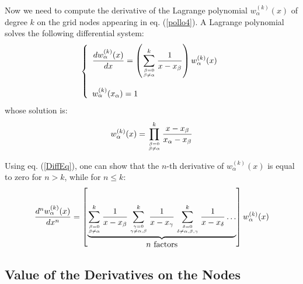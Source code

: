 \documentclass[10pt,a4paper]{article}
\begin{document}
Now we need to compute the derivative of the Lagrange polynomial
$w_\alpha^{(k)}(x)$ of degree $k$ on the grid nodes appearing in eq. (\ref{pollo4}). A
Lagrange polynomial solves the following differential system:
\begin{equation}\label{DiffEq}
\left\{
\begin{array}{l}
\displaystyle \frac{d w_\alpha^{(k)}(x)}{dx}
=\left(\sum_{\beta=0\atop \beta\neq\alpha}^k\frac{1}{x-x_\beta}\right)
w_\alpha^{(k)}(x)\\
\\
w_\alpha^{(k)}(x_\alpha) = 1
\end{array}
\right.
 \end{equation}
whose solution is:
\begin{equation}
w_\alpha^{(k)}(x) = \prod_{\beta=0\atop \beta\neq\alpha}^k\frac{x-x_\beta}{x_\alpha-x_\beta}
\end{equation}

Using eq. (\ref{DiffEq}), one can show that the $n$-th derivative of
$w_\alpha^{(k)}(x)$ is equal to zero for $n>k$, while for $n\leq k$:
\begin{equation}\label{NthDerivative}
\frac{d^n w_\alpha^{(k)}(x)}{dx^n}
=\left[\underbrace{\sum_{\beta=0\atop \beta\neq\alpha}^k\frac{1}{x-x_\beta}
\sum_{\gamma=0\atop \gamma\neq\alpha,\beta}^k\frac{1}{x-x_\gamma}
\sum_{\delta=0\atop \delta\neq\alpha,\beta,\gamma}^k\frac{1}{x-x_\delta}
\dots}_{\mbox{$n$ factors}}\right]
w_\alpha^{(k)}(x)
\end{equation}

\subsection{Value of the Derivatives on the Nodes}
\end{document}

